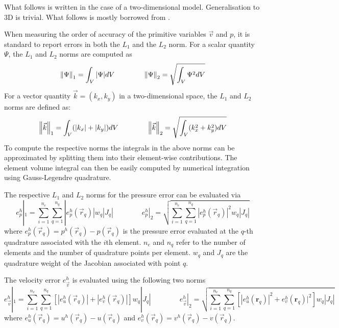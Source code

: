 
What follows is written in the case of a two-dimensional model. Generalisation to
3D is trivial. What follows is mostly borrowed from \cite{thmk14}.

When measuring the order of accuracy of the primitive variables $\vec{v}$ and $p$,
it is standard to report errors in both the $L_1$ and the $L_2$ norm.
For a scalar quantity $\Psi$, the $L_1$ and $L_2$ norms are computed as
\[
\left\lVert\Psi\right\rVert_1 = \int_V |\Psi| dV
\quad\quad
\quad\quad
\left\lVert\Psi\right\rVert_2 = \sqrt{ \int_V \Psi^2 dV }
\]
For a vector quantity $\vec{k}=(k_x,k_y)$ in a two-dimensional space,
the $L_1$ and $L_2$ norms are defined as:
\[
\left\lVert\vec{k}\right\rVert_1 = \int_V (|k_x|+|k_y|) dV
\quad\quad
\quad\quad
\left\lVert\vec{k}\right\rVert_2 = \sqrt{ \int_V (k_x^2+k_y^2) dV }
\]
To compute the respective norms
the integrals in the above norms can be approximated by splitting them
into their element-wise contributions. The element volume integral can then
be easily computed by numerical integration using Gauss-Legendre quadrature.

The respective $L_1$ and $L_2$ norms for the pressure error can be evaluated via
\[
e_p^h|_1 = \sum_{i=1}^{n_e} \sum_{q=1}^{n_q} |e_p^h(\vec{r}_q)| w_q |J_q|
\quad\quad
\quad\quad
e_p^h|_2=\sqrt{ \sum_{i=1}^{n_e} \sum_{q=1}^{n_q} |e_p^h(\vec{r}_q)|^2 w_q |J_q| }
\]
where $e_p^h(\vec{r}_q)=p^h(\vec{r}_q) - p(\vec{r}_q)$ 
is the pressure error evaluated at the $q$-th quadrature associated with
the $i$th element. $n_e$ and $n_q$ refer to the number of elements and
the number of quadrature points per element.
$w_q$ and $J_q$ are the quadrature weight of the Jacobian associated with
point $q$.

The velocity error $e_{\vec v}^h$ is evaluated using the following two norms
\[
e_{\vec{v}}^h|_1 = \sum_{i=1}^{n_e} \sum_{q=1}^{n_q} [ |e_u^h(\vec{r}_q)| + |e_v^h(\vec{r}_q)| ]    w_q |J_q|
\quad\quad
\quad\quad
e_{\vec v}^h|_2=\sqrt{ \sum_{i=1}^{n_e} \sum_{q=1}^{n_q} \left[ |e_u^h({\bm r}_q)|^2 +  e_v^h({\bm r}_q)|^2 \right] w_q |J_q| }
\]
where $e_u^h(\vec{r}_q)=u^h(\vec{r}_q) - u(\vec{r}_q)$ and $e_v^h(\vec{r}_q)=v^h(\vec{r}_q)-v(\vec{r}_q)$.




